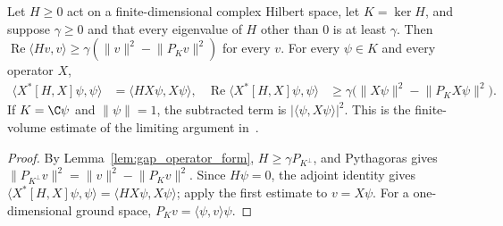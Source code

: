\begin{lemma}
    \label{lem:martingale_ground_projection_commutator_gap}
    \leanok
    Let $H\geq0$ act on a finite-dimensional complex Hilbert space, let $K=\ker H$,
    and suppose $\gamma\geq0$ and that every eigenvalue of $H$ other than $0$ is at
    least $\gamma$. Then
    $\operatorname{Re}\langle Hv,v\rangle\geq\gamma(\lVert v\rVert^2-\lVert P_Kv\rVert^2)$
    for every $v$. For every $\psi\in K$ and every operator $X$,
    \begin{align}
        \langle X^*[H,X]\psi,\psi\rangle
         & =\langle HX\psi,X\psi\rangle,
         &
        \operatorname{Re}\langle X^*[H,X]\psi,\psi\rangle
         & \geq\gamma\bigl(\lVert X\psi\rVert^2-\lVert P_KX\psi\rVert^2\bigr).
        \label{eq:martingale_ground_commutator}
    \end{align}
    If $K=\C\psi$ and $\lVert\psi\rVert=1$, the subtracted term is
    $\lvert\langle\psi,X\psi\rangle\rvert^2$. This is the finite-volume estimate
    of the limiting argument in~\cite[Section~6]{Nachtergaele1996Spectral}.
\end{lemma}
\begin{proof}\leanok
    By Lemma~\ref{lem:gap_operator_form}, $H\geq\gamma P_{K^\perp}$, and Pythagoras
    gives $\lVert P_{K^\perp}v\rVert^2=\lVert v\rVert^2-\lVert P_Kv\rVert^2$. Since
    $H\psi=0$, the adjoint identity gives
    $\langle X^*[H,X]\psi,\psi\rangle=\langle HX\psi,X\psi\rangle$; apply the
    first estimate to $v=X\psi$. For a one-dimensional ground space,
    $P_Kv=\langle\psi,v\rangle\psi$.
\end{proof}


